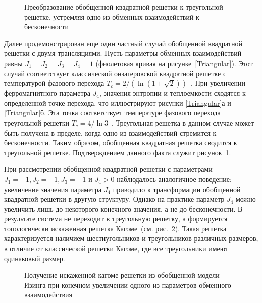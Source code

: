 \documentclass[utf8,12pt]{jetp}
\begin{document}
\begin{figure}[h]
	\caption{Преобразование обобщенной квадратной решетки к треугольной решетке, устремляя одно из обменных взаимодействий к бесконечности}
	\label{triag}
\end{figure}

Далее продемонстрирован еще один частный случай обобщенной квадратной решетки с двумя трансляциями. Пусть параметры обменных взаимодействий равны $J_1 = J_2 = J_3 = J_4 = 1$ (фиолетовая кривая на рисунке~\ref{Triangular}). Этот случай соответствует классической онзагеровской квадратной решетке с температурой фазового перехода $T_c = 2/(\ln (1+\sqrt{2}))$~\cite{kramers_wannier1, kramers_wannier2}. При увеличении ферромагнитного параметра $J_4$, значения энтропии и теплоемкости сходятся к определенной точке перехода, что иллюстрируют рисунки \ref{Triangular}а и \ref{Triangular}б. Эта точка соответствует температуре фазового перехода треугольной решетки $T_c = 4/\ln 3$~\cite{wannier1950}. Треугольная решетка в данном случае может быть получена в пределе, когда одно из взаимодействий стремится к бесконечности. Таким образом, обобщенная квадратная решетка сводится к треугольной решетке. Подтверждением данного факта служит рисунок~\ref{triag}. 

При рассмотрении обобщенной квадратной решетки с параметрами $J_1 = -1, J_2 = -1, J_3 = -1$ и $J_4 > 0$ наблюдалось аналогичное поведение: увеличение значения параметра $J_4$ приводило к трансформации обобщенной квадратной решетки в другую структуру. Однако на практике параметр $J_4$ можно увеличить лишь до некоторого конечного значения, а не до бесконечности. В результате система не переходит в треугольную решетку, а формируется топологически искаженная решетка Кагоме~(см. рис.~\ref{kagomelike}). Такая решетка характеризуется наличием шестиугольников и треугольников различных размеров, в отличие от классической решетки Кагоме, где все треугольники имеют одинаковый размер. 

\begin{figure}[h]
	\caption{Получение искаженной кагоме решетки из обобщенной модели Изинга при конечном увеличении одного из параметров обменного взаимодействия}
	\label{kagomelike}
\end{figure}
\end{document}

